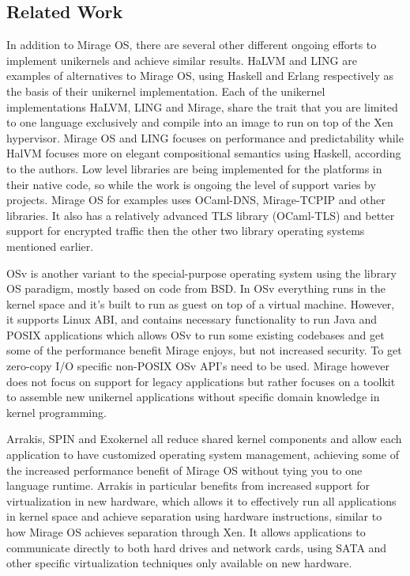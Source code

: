 \documentclass[english,10pt,twocolumn]{article}
\begin{document}
\subsection{Related Work}

In addition to Mirage OS, there are several other different ongoing efforts to implement unikernels and achieve similar results.
HaLVM\cite{halvm} and LING\cite{ling} are examples of alternatives to Mirage OS, using Haskell and Erlang respectively as the basis of their unikernel implementation.
Each of the unikernel implementations HaLVM, LING and Mirage, share the trait that you are limited to one language exclusively and compile into an image to run on top of the Xen hypervisor.
Mirage OS and LING focuses on performance and predictability while HalVM focuses more on elegant compositional semantics using Haskell, according to the authors\cite{tripreport}.
Low level libraries are being implemented for the platforms in their native code, so while the work is ongoing the level of support varies by projects.
Mirage OS for examples uses OCaml-DNS, Mirage-TCPIP and other libraries. It also has a relatively advanced TLS library (OCaml-TLS) and better support for encrypted traffic then the other two library operating systems mentioned earlier.

OSv\cite{osv} is another variant to the special-purpose operating system using the library OS paradigm, mostly based on code from BSD.
In OSv everything runs in the kernel space and it's built to run as guest on top of a virtual machine.
However, it supports Linux ABI, and contains necessary functionality to run Java and POSIX applications which allows OSv to run some existing codebases and get some of the performance benefit Mirage enjoys, but not increased security.
To get zero-copy I/O specific non-POSIX OSv API's need to be used.
Mirage however does not focus on support for legacy applications but rather focuses on a toolkit to assemble new unikernel applications without specific domain knowledge in kernel programming.

Arrakis\cite{arrakis}, SPIN\cite{spin} and Exokernel\cite{exokernel} all reduce shared kernel components and allow each application to have customized operating system management, achieving some of the increased performance benefit of Mirage OS without tying you to one language runtime.
Arrakis in particular benefits from increased support for virtualization in new hardware, which allows it to effectively run all applications in kernel space and achieve separation using hardware instructions, similar to how Mirage OS achieves separation through Xen.
It allows applications to communicate directly to both hard drives and network cards, using SATA and other specific virtualization techniques only available on new hardware.
\end{document}
